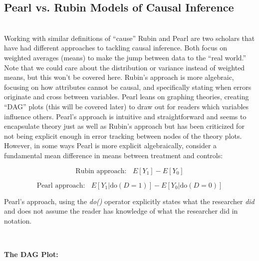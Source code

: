 \documentclass[12pt]{article}\usepackage[]{graphicx}\usepackage[]{color}
\begin{document}
\begin{flushleft}
\clearpage

\subsection{Pearl vs. Rubin Models of Causal Inference}
\hfill \\

Working with similar definitions of ``cause'' Rubin and Pearl are two scholars that have had different approaches to tackling causal inference. Both focus on weighted averages (means) to make the jump between data to the ``real world.'' Note that we could care about the distribution or variance instead of weighted means, but this won't be covered here. Rubin's approach is more algebraic, focusing on how attributes cannot be causal, and specifically stating when errors originate and cross between variables. Pearl leans on graphing theories, creating ``DAG'' plots (this will be covered later) to draw out for readers which variables influence others. Pearl's approach is intuitive and straightforward and seems to encapsulate theory just as well as Rubin's approach but has been criticized for not being explicit enough in error tracking between nodes of the theory plots. However, in some ways Pearl is more explicit algebraically, consider a fundamental mean difference in means between treatment and controls:

\begin{equation}
\text{Rubin approach:} ~~~~ E[Y_1] - E[Y_0]
\end{equation}

\begin{equation}
\text{Pearl approach:} ~~~~ E[Y_1 | \text{do}(D=1)] - E[Y_0 | \text{do}(D=0)]
\end{equation}

Pearl's approach, using the \textit{do()} operator explicitly states what the researcher \textit{did} and does not assume the reader has knowledge of what the researcher did in notation.


\hfill \\
\noindent \textbf{The DAG Plot:}
\hfill \\

\begin{center}


\end{center}
\end{flushleft}
\end{document}
